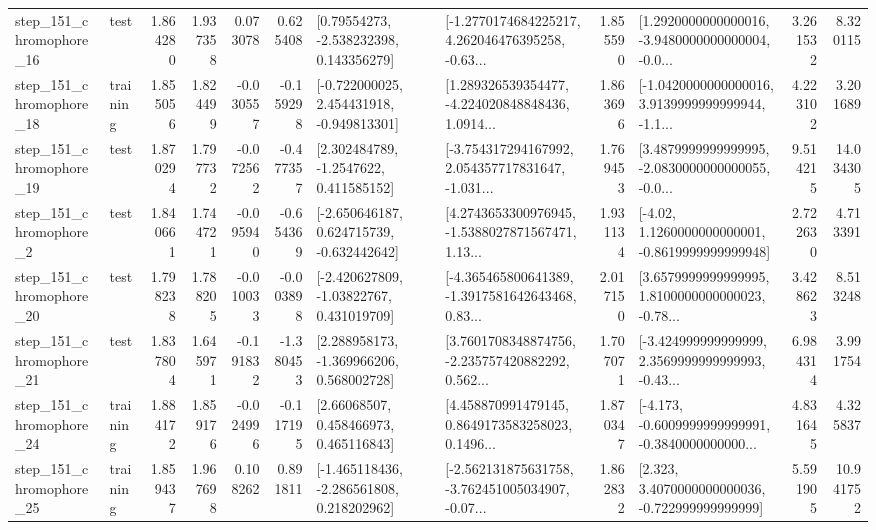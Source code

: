 \begin{tabular}{llrrrrllrlrr}
  step\_151\_chromophore\_16 &      test &      1.864280 &    1.937358 &      0.073078 &  0.625408 &     [0.79554273, -2.538232398, 0.143356279] &  [-1.2770174684225217, 4.262046476395258, -0.63... &       1.855590 &  [1.2920000000000016, -3.9480000000000004, -0.0... &            3.261532 &          8.320115 \\
  step\_151\_chromophore\_18 &  training &      1.855056 &    1.824499 &     -0.030557 & -0.159298 &   [-0.722000025, 2.454431918, -0.949813301] &  [1.289326539354477, -4.224020848848436, 1.0914... &       1.863696 &  [-1.0420000000000016, 3.9139999999999944, -1.1... &            4.223102 &          3.201689 \\
  step\_151\_chromophore\_19 &      test &      1.870294 &    1.797732 &     -0.072562 & -0.477357 &      [2.302484789, -1.2547622, 0.411585152] &  [-3.754317294167992, 2.054357717831647, -1.031... &       1.769453 &  [3.4879999999999995, -2.0830000000000055, -0.0... &            9.514215 &         14.034305 \\
   step\_151\_chromophore\_2 &      test &      1.840661 &    1.744721 &     -0.095940 & -0.654369 &   [-2.650646187, 0.624715739, -0.632442642] &  [4.2743653300976945, -1.5388027871567471, 1.13... &       1.931134 &   [-4.02, 1.1260000000000001, -0.8619999999999948] &            2.722630 &          4.713391 \\
  step\_151\_chromophore\_20 &      test &      1.798238 &    1.788205 &     -0.010033 & -0.003898 &    [-2.420627809, -1.03822767, 0.431019709] &  [-4.365465800641389, -1.3917581642643468, 0.83... &       2.017150 &  [3.6579999999999995, 1.8100000000000023, -0.78... &            3.428623 &          8.513248 \\
  step\_151\_chromophore\_21 &      test &      1.837804 &    1.645971 &     -0.191832 & -1.380453 &    [2.288958173, -1.369966206, 0.568002728] &  [3.7601708348874756, -2.235757420882292, 0.562... &       1.707071 &  [-3.424999999999999, 2.3569999999999993, -0.43... &            6.984314 &          3.991754 \\
  step\_151\_chromophore\_24 &  training &      1.884172 &    1.859176 &     -0.024996 & -0.117195 &      [2.66068507, 0.458466973, 0.465116843] &  [4.458870991479145, 0.8649173583258023, 0.1496... &       1.870347 &  [-4.173, -0.6009999999999991, -0.3840000000000... &            4.831645 &          4.325837 \\
  step\_151\_chromophore\_25 &  training &      1.859437 &    1.967698 &      0.108262 &  0.891811 &   [-1.465118436, -2.286561808, 0.218202962] &  [-2.562131875631758, -3.762451005034907, -0.07... &       1.862832 &    [2.323, 3.4070000000000036, -0.722999999999999] &            5.591905 &         10.941752 \\

\end{tabular}
